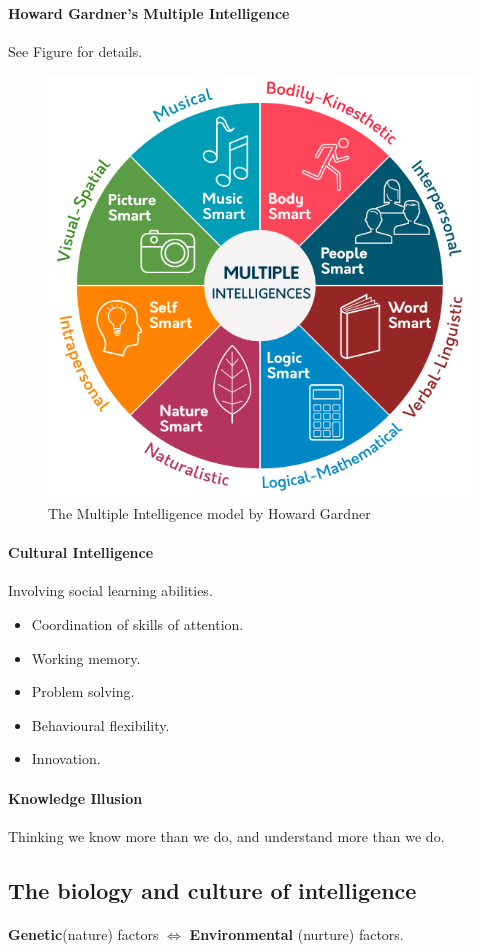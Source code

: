 \documentclass{article}
\begin{document}
	\paragraph{Howard Gardner's Multiple Intelligence} See Figure for details.
	\begin{figure}
		\centering
		\includegraphics[width = \linewidth]{pic/multiple_intelligences}
		\caption{The Multiple Intelligence model by Howard Gardner}	
	\end{figure}
	\paragraph{Cultural Intelligence} Involving social learning abilities.
	\begin{itemize}
		\item Coordination of skills of attention.
		\item Working memory.
		\item Problem solving.
		\item Behavioural flexibility.
		\item Innovation.
	\end{itemize}
	\paragraph{Knowledge Illusion} Thinking we know more than we do, and understand more than we do.
	\subsection{The biology and culture of intelligence}
	\paragraph{} \textbf{Genetic}(nature) factors $\iff$ \textbf{Environmental} (nurture) factors.
\end{document}
